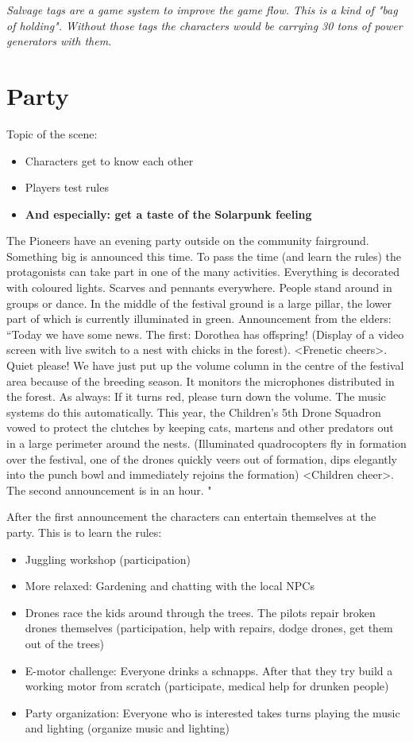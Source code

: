 \emph{Salvage tags are a game system to improve the game flow. This is a kind of "bag of holding". Without those tags the characters would be carrying 30 tons of power generators with them.}


\section{Party}

Topic of the scene: 
\begin{itemize}
\item Characters get to know each other
\item Players test rules
\item \textbf{And especially: get a taste of the Solarpunk feeling}
\end{itemize}

The Pioneers have an evening party outside on the community fairground. Something big is announced this time. To pass the time (and learn the rules) the protagonists can take part in one of the many activities. 
Everything is decorated with coloured lights. Scarves and pennants everywhere. People stand around in groups or dance. In the middle of the festival ground is a large pillar, the lower part of which is currently illuminated in green.
Announcement from the elders: “Today we have some news. The first: Dorothea has offspring! (Display of a video screen with live switch to a nest with chicks in the forest). <Frenetic cheers>. Quiet please! We have just put up the volume column in the centre of the festival area because of the breeding season.
It monitors the microphones distributed in the forest.
As always: If it turns red, please turn down the volume. The music systems do this automatically. This year, the Children's 5th Drone Squadron vowed to protect the clutches by keeping cats, martens and other predators out in a large perimeter around the nests. (Illuminated quadrocopters fly in formation over the festival, one of the drones quickly veers out of formation, dips elegantly into the punch bowl and immediately rejoins the formation) <Children cheer>.
The second announcement is in an hour.
"

After the first announcement the characters can entertain themselves at the party. This is to learn the rules:

\begin{itemize}
\item Juggling workshop (participation)
\item More relaxed: Gardening and chatting with the local NPCs
\item Drones race the kids around through the trees. The pilots repair broken drones themselves (participation, help with repairs, dodge drones, get them out of the trees)
\item E-motor challenge: Everyone drinks a schnapps. After that they try build a working motor from scratch (participate, medical help for drunken people)
\item Party organization: Everyone who is interested takes turns playing the music and lighting (organize music and lighting)
\end{itemize}

